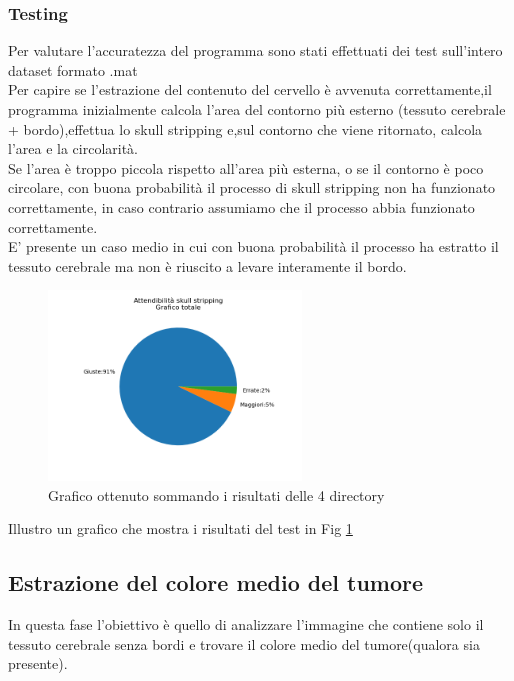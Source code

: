 \documentclass{article}
\begin{document}
\subsubsection{Testing}
Per valutare l'accuratezza del programma sono stati effettuati dei test sull'intero dataset formato .mat\\
Per capire se l'estrazione del contenuto del cervello è avvenuta correttamente,il programma inizialmente calcola l'area del contorno più esterno (tessuto cerebrale + bordo),effettua lo skull stripping e,sul contorno che viene ritornato, calcola l'area e la circolarità.\\
Se l'area è troppo piccola rispetto all'area più esterna, o se il contorno è poco circolare, con buona probabilità il processo di skull stripping non ha funzionato correttamente, in caso contrario assumiamo che il processo abbia funzionato correttamente.\\
E' presente un caso medio in cui con buona probabilità il processo ha estratto il tessuto cerebrale ma non è riuscito a levare interamente il bordo.\\
\begin{figure}
\centering
\includegraphics[width=0.6\textwidth]{ss.png}
\caption{\label{fig:ss} Grafico ottenuto sommando i risultati delle 4 directory}
\end{figure}
Illustro un grafico che mostra i risultati del test in Fig \ref{fig:ss}
\subsection{Estrazione del colore medio del tumore}
In questa fase l'obiettivo è quello di analizzare l'immagine che contiene solo il tessuto cerebrale senza bordi e trovare il colore medio del tumore(qualora sia presente).
\end{document}
